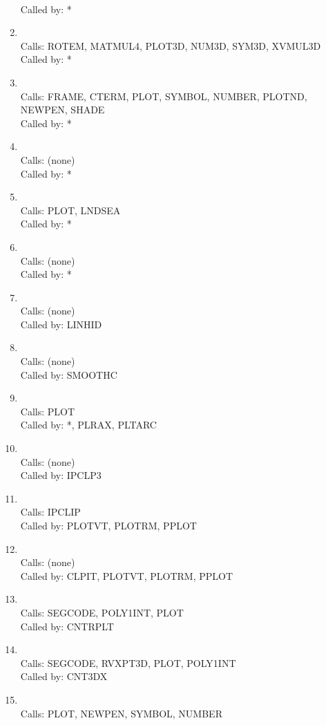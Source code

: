 \documentclass[11pt]{report}
\begin{document}
\begin{enumerate}
\\ Called by: *
\item {}
\\ Calls:  ROTEM, MATMUL4, PLOT3D, NUM3D, SYM3D, XVMUL3D
\\ Called by: *
\item {}
\\ Calls:  FRAME, CTERM, PLOT, SYMBOL, NUMBER, PLOTND, NEWPEN, SHADE
\\ Called by: *
\item {}
\\ Calls:  (none)
\\ Called by: *
\item {}
\\ Calls:  PLOT, LNDSEA
\\ Called by: *
\item {}
\\ Calls:  (none)
\\ Called by: *
\item {}
\\ Calls:  (none)
\\ Called by: LINHID
\item {}
\\ Calls:  (none)
\\ Called by: SMOOTHC
\item {}
\\ Calls:  PLOT
\\ Called by: *, PLRAX, PLTARC
\item {}
\\ Calls:  (none)
\\ Called by: IPCLP3
\item {}
\\ Calls:  IPCLIP
\\ Called by: PLOTVT, PLOTRM, PPLOT
\item {}
\\ Calls:  (none)
\\ Called by: CLPIT, PLOTVT, PLOTRM, PPLOT
\item {}
\\ Calls:  SEGCODE, POLY1INT, PLOT
\\ Called by: CNTRPLT
\item {}
\\ Calls:  SEGCODE, RVXPT3D, PLOT, POLY1INT
\\ Called by: CNT3DX
\item {}
\\ Calls:  PLOT, NEWPEN, SYMBOL, NUMBER

\end{enumerate}
\end{document}
